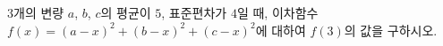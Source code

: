 $3$개의 변량 $a$, $b$, $c$의 평균이 $5$, 표준편차가 $4$일 때, 이차함수 $f(x)=(a-x)^2+(b-x)^2+(c-x)^2$에 대하여 $f(3)$의 값을 구하시오.
